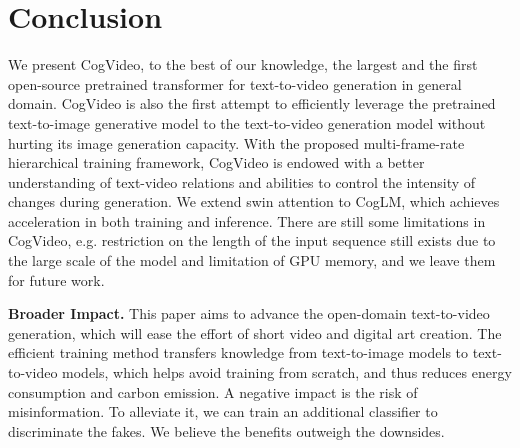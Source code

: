 \section{Conclusion}
We present CogVideo, to the best of our knowledge, 
the largest and the first open-source pretrained transformer for text-to-video generation in general domain. CogVideo is also the first attempt to efficiently leverage the pretrained text-to-image generative model to the text-to-video generation model without hurting its image generation capacity.
With the proposed multi-frame-rate hierarchical training framework, CogVideo is endowed with a better understanding of text-video relations and abilities to control the intensity of changes during generation. We extend swin attention to CogLM, which achieves acceleration in both training and inference. There are still some limitations in CogVideo, e.g. restriction on the length of the input sequence still exists due to the large scale of the model and limitation of GPU memory, and we leave them for future work. 

\textbf{Broader Impact. }This paper aims to advance the open-domain text-to-video generation, which will ease the effort of short video and digital art creation. The efficient training method transfers knowledge from text-to-image models to text-to-video models, which helps avoid training from scratch, and thus reduces energy consumption and carbon emission. A negative impact is the risk of misinformation. To alleviate it, we can train an additional classifier to discriminate the fakes. We believe the benefits outweigh the downsides.
